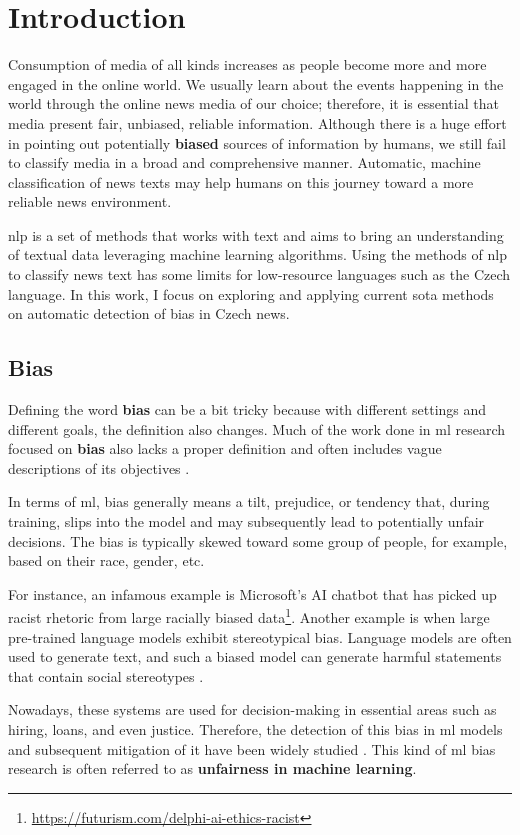\chapter{Introduction}
Consumption of media of all kinds increases as people become more and more engaged in the online world. We usually learn about the events happening in the world through the online news media of our choice; therefore, it is essential that media present fair, unbiased, reliable information. Although there is a huge effort in pointing out potentially \textbf{biased} sources of information by humans, we still fail to classify media in a broad and comprehensive manner. Automatic, machine classification of news texts may help humans on this journey toward a more reliable news environment.

\gls{nlp} is a set of methods that works with text and aims to bring an understanding of textual data leveraging machine learning algorithms. Using the methods of \gls{nlp} to classify news text has some limits for low-resource languages such as the Czech language. In this work, I focus on exploring and applying current \gls{sota} methods on automatic detection of bias in Czech news.


\section{Bias}
Defining the word \textbf{bias} can be a bit tricky because with different settings and different goals, the definition also changes. Much of the work done in \gls{ml} research focused on \textbf{bias} also lacks a proper definition and often includes vague descriptions of its objectives \cite{blodgett2020language}. 

In terms of \Gls{ml}, bias generally means a tilt, prejudice, or tendency that, during training, slips into the model and may subsequently lead to potentially unfair decisions. The bias is typically skewed toward some group of people, for example, based on their race, gender, etc. 

For instance, an infamous example is Microsoft's AI chatbot that has picked up racist rhetoric from large racially biased data\footnote{\url{https://futurism.com/delphi-ai-ethics-racist}}. Another example is when large pre-trained language models exhibit stereotypical bias. Language models are often used to generate text, and such a biased model can generate harmful statements that contain social stereotypes \cite{nadeem2021stereoset}.

Nowadays, these systems are used for decision-making in essential areas such as hiring, loans, and even justice. Therefore, the detection of this bias in \Gls{ml} models and subsequent mitigation of it have been widely studied \cite{blodgett2020language}. This kind of \gls{ml} bias research is often referred to as \textbf{unfairness in machine learning}.

